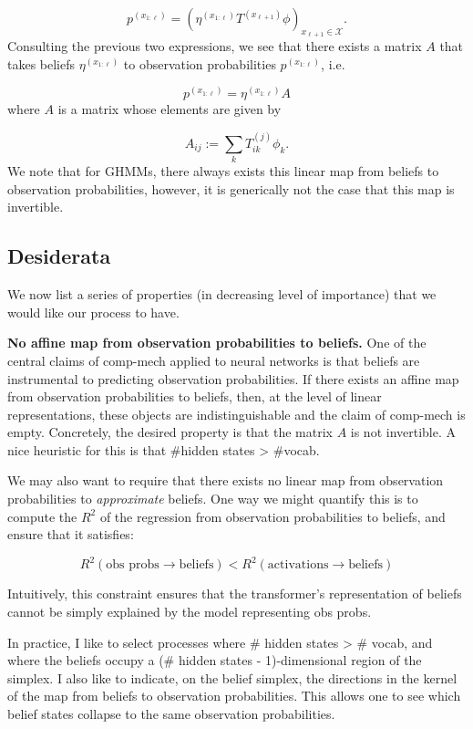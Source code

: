 \documentclass[11pt]{article}
\begin{document}
\[
p^{(x_{1:\ell})} = (\eta^{(x_{1:\ell})}T^{(x_{\ell+1})}\phi)_{x_{\ell+1}\in\mathcal{X}} .
\]
Consulting the previous two expressions, we see that there exists a matrix \(A\) that takes beliefs \(\eta^{(x_{1:\ell})}\) to observation probabilities \(p^{(x_{1:\ell})}\), i.e.

\[
p^{(x_{1:\ell})} = \eta^{(x_{1:\ell})} A
\]
where \(A\) is a matrix whose elements are given by

\[
A_{ij} := \sum_{k} T_{ik}^{(j)} \phi_k .
\]
We note that for GHMMs, there always exists this linear map from beliefs to observation probabilities, however, it is generically not the case that this map is invertible.

\subsection{Desiderata}\label{desiderata}

We now list a series of properties (in decreasing level of importance) that we would like our process to have.

\textbf{No affine map from observation probabilities to beliefs.} One of the central claims of comp-mech applied to neural networks is that beliefs are instrumental to predicting observation probabilities. If there exists an affine map from observation probabilities to beliefs, then, at the level of linear representations, these objects are indistinguishable and the claim of comp-mech is empty. Concretely, the desired property is that the matrix \(A\) is not invertible. A nice heuristic for this is that \#hidden states \textgreater{} \#vocab.

We may also want to require that there exists no linear map from observation probabilities to \emph{approximate} beliefs. One way we might quantify this is to compute the \(R^2\) of the regression from observation probabilities to beliefs, and ensure that it satisfies:

\[ R^2(\text{obs probs} \to \text{beliefs}) < R^2(\text{activations} \to \text{beliefs}) \]

Intuitively, this constraint ensures that the transformer's representation of beliefs cannot be simply explained by the model representing obs probs.

In practice, I like to select processes where \# hidden states \textgreater{} \# vocab, and where the beliefs occupy a (\# hidden states - 1)-dimensional region of the simplex. I also like to indicate, on the belief simplex, the directions in the kernel of the map from beliefs to observation probabilities. This allows one to see which belief states collapse to the same observation probabilities.
\end{document}
